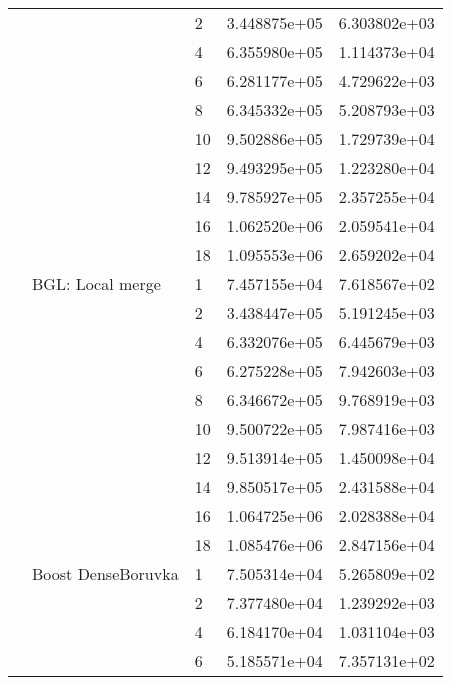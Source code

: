 \begin{tabular}{lllrr}
                      &            & 2  &  3.448875e+05 &  6.303802e+03 \\
                      &            & 4  &  6.355980e+05 &  1.114373e+04 \\
                      &            & 6  &  6.281177e+05 &  4.729622e+03 \\
                      &            & 8  &  6.345332e+05 &  5.208793e+03 \\
                      &            & 10 &  9.502886e+05 &  1.729739e+04 \\
                      &            & 12 &  9.493295e+05 &  1.223280e+04 \\
                      &            & 14 &  9.785927e+05 &  2.357255e+04 \\
                      &            & 16 &  1.062520e+06 &  2.059541e+04 \\
                      &            & 18 &  1.095553e+06 &  2.659202e+04 \\
                      & BGL: Local merge & 1  &  7.457155e+04 &  7.618567e+02 \\
                      &            & 2  &  3.438447e+05 &  5.191245e+03 \\
                      &            & 4  &  6.332076e+05 &  6.445679e+03 \\
                      &            & 6  &  6.275228e+05 &  7.942603e+03 \\
                      &            & 8  &  6.346672e+05 &  9.768919e+03 \\
                      &            & 10 &  9.500722e+05 &  7.987416e+03 \\
                      &            & 12 &  9.513914e+05 &  1.450098e+04 \\
                      &            & 14 &  9.850517e+05 &  2.431588e+04 \\
                      &            & 16 &  1.064725e+06 &  2.028388e+04 \\
                      &            & 18 &  1.085476e+06 &  2.847156e+04 \\
                      & Boost DenseBoruvka & 1  &  7.505314e+04 &  5.265809e+02 \\
                      &            & 2  &  7.377480e+04 &  1.239292e+03 \\
                      &            & 4  &  6.184170e+04 &  1.031104e+03 \\
                      &            & 6  &  5.185571e+04 &  7.357131e+02 \\

\end{tabular}
